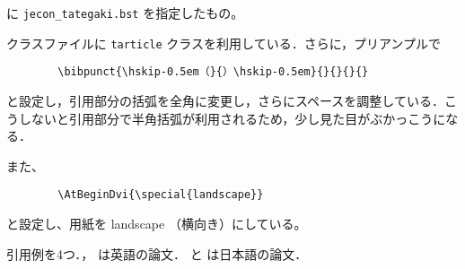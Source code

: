 \documentclass[10pt]{tarticle}
\begin{document}
\verb|| に \verb|jecon_tategaki.bst| を指定したもの。
\vspace*{1em}

クラスファイルに \texttt{tarticle} クラスを利用している．さらに，プリアンプルで
\begin{verbatim}
        \bibpunct{\hskip-0.5em（}{）\hskip-0.5em}{}{}{}{}
\end{verbatim}
と設定し，引用部分の括弧を全角に変更し，さらにスペースを調整している．こ
うしないと引用部分で半角括弧が利用されるため，少し見た目がぶかっこうにな
る．

また、
\begin{verbatim}
        \AtBeginDvi{\special{landscape}}
\end{verbatim}
と設定し、用紙を landscape （横向き）にしている。
\vspace*{2em}

引用例を4つ．\citet{ishikawa03:_green_gas_emiss_contr_open_econom}，
\citet{takeda06:_cge_analy_welfar_effec_trade} は英語の論文．
\citet{oyama99:_mark_stru} と \citet{kuroda97jp:keo} は日本語の論文．

\nocite{*}



%

\end{document}
